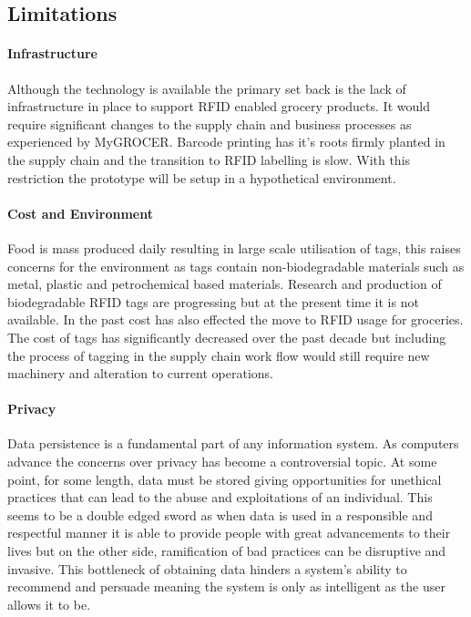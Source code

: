 \documentclass[a4paper, 11pt]{article}
\begin{document}
\vspace{\baselineskip}
\vspace{\baselineskip}
\vspace{\baselineskip}

\subsection{Limitations}

\paragraph{Infrastructure}Although the technology is available the primary set back is the lack of infrastructure in place to support RFID enabled grocery products. It would require significant changes to the supply chain and business processes \cite{pervasiveComp} as experienced by MyGROCER. Barcode printing has it's roots firmly planted in the supply chain and the transition to RFID labelling is slow. With this restriction the prototype will be setup in a hypothetical environment.

\paragraph{Cost and Environment}Food is mass produced daily resulting in large scale utilisation of tags, this raises concerns for the environment as tags contain non-biodegradable materials such as metal, plastic and petrochemical based materials.\cite{bioTags} Research and production of biodegradable RFID tags are progressing but at the present time it is not available. In the past cost has also effected the move to RFID usage for groceries. The cost of tags has significantly decreased over the past decade but including the process of tagging in the supply chain work flow would still require new machinery and alteration to current operations. 

\paragraph{Privacy}Data persistence is a fundamental part of any information system. As computers advance the concerns over privacy has become a controversial topic. At some point, for some length, data must be stored giving opportunities for unethical practices that can lead to the abuse and exploitations of an individual. This seems to be a double edged sword as when data is used in a responsible and respectful manner it is able to provide people with great advancements to their lives but on the other side, ramification of bad practices can be disruptive and invasive. This bottleneck of obtaining data hinders a system's ability to recommend and persuade meaning the system is only as intelligent as the user allows it to be.
\clearpage
\end{document}
